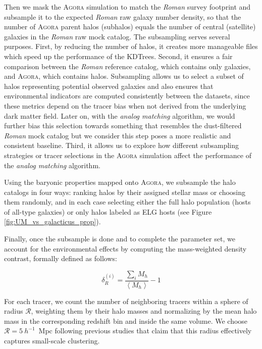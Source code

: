 \documentclass[]{aa} %
\begin{document}
Then we mask the \textsc{Agora} simulation to match the \emph{Roman} survey footprint and subsample it to the expected \emph{Roman} raw galaxy number density, so that the number of \textsc{Agora} parent halos (subhalos) equals the number of central (satellite) galaxies in the \emph{Roman} raw mock catalog. The subsampling serves several purposes. First, by reducing the number of halos, it creates more manageable files which speed up the performance of the KDTrees. Second, it ensures a fair comparison between the \emph{Roman} reference catalog, which contains only galaxies, and \textsc{Agora}, which contains halos. Subsampling allows us to select a subset of halos representing potential observed galaxies and also ensures that environmental indicators are computed consistently between the datasets, since these metrics depend on the tracer bias when not derived from the underlying dark matter field. Later on, with the \emph{analog matching}  algorithm, we would further bias this selection towards something that resembles the dust-filtered \emph{Roman} mock catalog but we consider this step poses a more realistic and consistent baseline. Third, it allows us to explore how different subsampling strategies or tracer selections in the \textsc{Agora} simulation affect the performance of the \emph{analog matching} algorithm.

Using the baryonic properties mapped onto \textsc{Agora}, we subsample the halo catalogs in four ways: ranking halos by their assigned stellar mass or choosing them randomly, and in each case selecting either the full halo population (hosts of all-type galaxies) or only halos labeled as ELG hosts (see Figure \ref{fig:UM_vs_galacticus_prop}). 

Finally, once the subsample is done and to complete the parameter set, we account for the environmental effects by computing the mass-weighted density contrast, formally defined as follows:

\begin{equation}
\mathcal{\delta}^{(i)}_R = \frac{\sum_{i} M_h}{\left<M_h\right>}-1 
\end{equation}

For each tracer, we count the number of neighboring tracers within a sphere of radius $\mathcal{R}$, weighting them by their halo masses and normalizing by the mean halo mass in the corresponding redshift bin and inside the same volume. We choose $\mathcal{R} = 5~h^{-1}$~Mpc following previous studies \citep{balaguera2024,Wu2024} that claim that this radius effectively captures small-scale clustering. 
\end{document}
